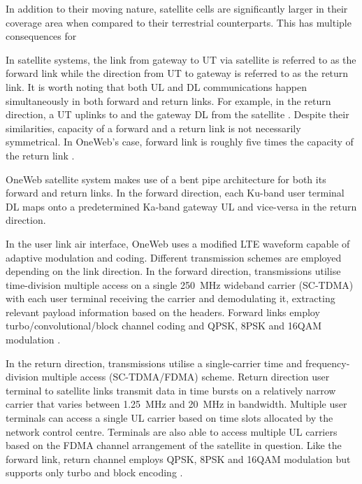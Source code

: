 \documentclass[english, 12pt, a4paper, elec, utf8, a-1b, online]{aaltothesis}
\begin{document}
In addition to their moving nature, satellite cells are significantly larger in their coverage area when compared to their terrestrial counterparts.
This has multiple consequences for \cite{corson2019admission}

In satellite systems, the link from gateway to UT via satellite is referred to as the forward link while the direction from UT to gateway is referred to as the return link.
It is worth noting that both UL and DL communications happen simultaneously in both forward and return links.
For example, in the return direction, a UT uplinks to and the gateway DL from the satellite \cite{kymeta2019link}.
Despite their similarities, capacity of a forward and a return link is not necessarily symmetrical.
In OneWeb's case, forward link is roughly five times the capacity of the return link \cite{worldvu2016loi, portillo2019technical}.

OneWeb satellite system makes use of a bent pipe architecture for both its forward and return links. In the forward direction, each Ku-band user terminal DL maps onto a predetermined Ka-band gateway UL and vice-versa in the return direction. \cite{worldvu2016loi, portillo2019technical}

In the user link air interface, OneWeb uses a modified LTE waveform capable of adaptive modulation and coding.
Different transmission schemes are employed depending on the link direction.
In the forward direction, transmissions utilise time-division multiple access on a single \SI{250}{\mega\hertz} wideband carrier (SC-TDMA) with each user terminal receiving the carrier and demodulating it, extracting relevant payload information based on the headers. Forward links employ turbo/convolutional/block
channel coding and QPSK, 8PSK and 16QAM modulation \cite{allen2022terrestrial, worldvu2016loi}.

In the return direction, transmissions utilise a single-carrier time and frequency-division multiple access (SC-TDMA/FDMA) scheme.
Return direction user terminal to satellite links transmit data in time bursts on a relatively narrow carrier that varies between \SI{1.25}{\mega\hertz} and \SI{20}{\mega\hertz} in bandwidth.
Multiple user terminals can access a single UL carrier based on time slots allocated by the network control centre.
Terminals are also able to access multiple UL carriers based on the FDMA channel arrangement of the satellite in question. Like the forward link,
return channel employs QPSK, 8PSK and 16QAM modulation but supports only turbo and block encoding \cite{allen2022terrestrial,worldvu2016loi}.
\end{document}
